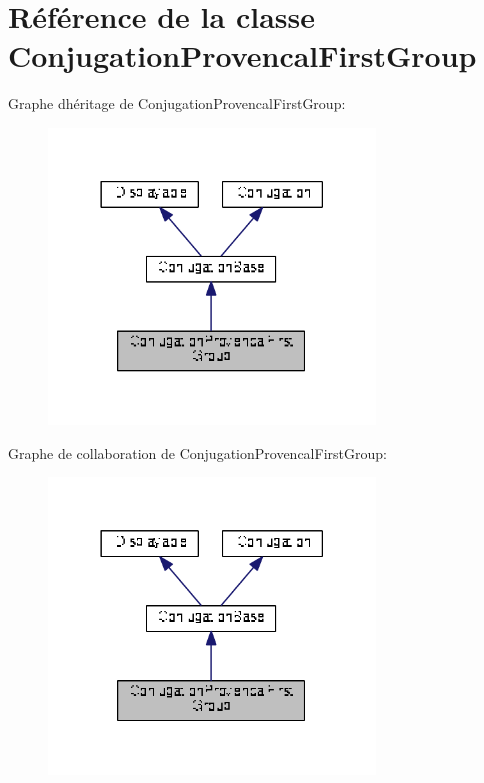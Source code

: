 \hypertarget{class_conjugation_provencal_first_group}{}\section{Référence de la classe Conjugation\+Provencal\+First\+Group}
\label{class_conjugation_provencal_first_group}


Graphe d\textquotesingle{}héritage de Conjugation\+Provencal\+First\+Group\+:
\nopagebreak
\begin{figure}[H]
\begin{center}
\leavevmode
\includegraphics[width=246pt]{class_conjugation_provencal_first_group__inherit__graph}
\end{center}
\end{figure}


Graphe de collaboration de Conjugation\+Provencal\+First\+Group\+:
\nopagebreak
\begin{figure}[H]
\begin{center}
\leavevmode
\includegraphics[width=246pt]{class_conjugation_provencal_first_group__coll__graph}
\end{center}
\end{figure}
